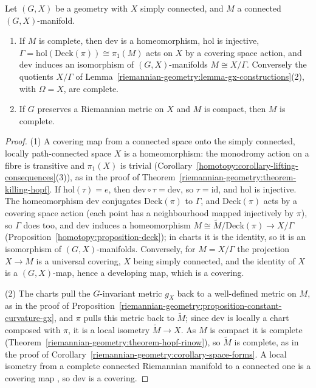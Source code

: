 \begin{proposition}\label{riemannian-geometry:proposition-complete-gx}
Let $(G, X)$ be a geometry with $X$ simply connected, and $M$ a connected $(G, X)$-manifold.
\begin{enumerate}
\item If $M$ is complete, then $\mathrm{dev}$ is a homeomorphism, $\mathrm{hol}$ is injective, $\Gamma = \mathrm{hol}(\mathrm{Deck}(\pi)) \cong \pi_1(M)$ acts on $X$ by a covering space action, and $\mathrm{dev}$ induces an isomorphism of
$(G, X)$-manifolds $M \cong X/\Gamma$. Conversely the quotients $X/\Gamma$ of Lemma~\ref{riemannian-geometry:lemma-gx-constructions}(2), with $\Omega = X$, are complete.
\item If $G$ preserves a Riemannian metric on $X$ and $M$ is compact, then $M$ is complete.
\end{enumerate}
\end{proposition}

\begin{proof}
(1) A covering map from a connected space onto the simply connected, locally path-connected space $X$ is a homeomorphism: the monodromy action on a fibre is transitive and $\pi_1(X)$ is trivial
(Corollary~\ref{homotopy:corollary-lifting-consequences}(3)), as in the proof of Theorem~\ref{riemannian-geometry:theorem-killing-hopf}. If $\mathrm{hol}(\tau) = e$, then $\mathrm{dev} \circ \tau = \mathrm{dev}$, so $\tau = \mathrm{id}$, and
$\mathrm{hol}$ is injective. The homeomorphism $\mathrm{dev}$ conjugates $\mathrm{Deck}(\pi)$ to $\Gamma$, and $\mathrm{Deck}(\pi)$ acts by a covering space action (each point has a neighbourhood mapped injectively by $\pi$), so $\Gamma$ does too,
and $\mathrm{dev}$ induces a homeomorphism $M \cong \widetilde{M}/\mathrm{Deck}(\pi) \to X/\Gamma$ (Proposition~\ref{homotopy:proposition-deck}); in charts it is the identity, so it is an isomorphism of $(G, X)$-manifolds. Conversely, for
$M = X/\Gamma$ the projection $X \to M$ is a universal covering, $X$ being simply connected, and the identity of $X$ is a $(G, X)$-map, hence a developing map, which is a covering.

(2) The charts pull the $G$-invariant metric $g_X$ back to a well-defined metric on $M$, as in the proof of Proposition~\ref{riemannian-geometry:proposition-constant-curvature-gx}, and $\pi$ pulls this metric back to $\widetilde{M}$; since
$\mathrm{dev}$ is locally a chart composed with $\pi$, it is a local isometry $\widetilde{M} \to X$. As $M$ is compact it is complete (Theorem~\ref{riemannian-geometry:theorem-hopf-rinow}), so $\widetilde{M}$ is complete, as in the proof of
Corollary~\ref{riemannian-geometry:corollary-space-forms}. A local isometry from a complete connected Riemannian manifold to a connected one is a covering map \cite[Chapter 7]{do-carmo-riemannian}, so $\mathrm{dev}$ is a covering.
\end{proof}

